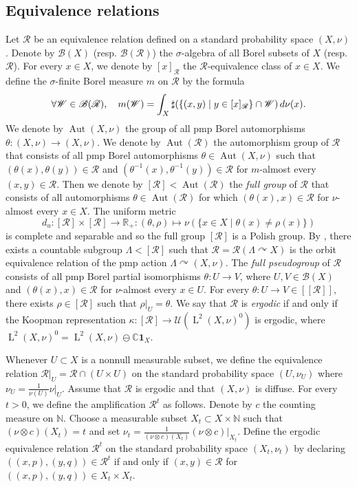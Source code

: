 \documentclass[11pt]{amsart}
\numberwithin{equation}{section}
\theoremstyle{plain}
\theoremstyle{definition}
\newcommand{\N}{\mathbb{N}}
\newcommand{\R}{\mathbb{R}}
\newcommand{\C}{\mathbb{C}}
\newcommand{\Aut}{\operatorname{Aut}}
\newcommand{\rL}{\operatorname{L}}
\begin{document}
\subsection{Equivalence relations}

Let $\mathscr R$ be an equivalence relation defined on a standard probability space $(X, \nu)$. Denote by $\mathscr B(X)$ (resp.\! $\mathscr B(\mathscr R)$) the $\sigma$-algebra of all Borel subsets of $X$ (resp.\! $\mathscr R$). For every $x \in X$, we denote by $[x]_{\mathscr R}$ the $\mathscr R$-equivalence class of $x \in X$. We define the $\sigma$-finite Borel measure $m$ on $\mathscr R$ by the formula
$$\forall \mathscr W \in \mathscr B(\mathscr R), \quad m (\mathscr W) = \int_{X} \sharp (\left\{(x, y) \mid y \in [x]_{\mathscr R} \right\}\cap \mathscr W) \, {\rm d}\nu(x).$$
We denote by $\Aut(X, \nu)$ the group of all pmp Borel automorphisms $\theta : (X, \nu) \to (X, \nu)$. We denote by $\Aut(\mathscr R)$ the automorphism group of $\mathscr R$ that consists of all pmp Borel automorphisms $\theta \in \Aut(X, \nu)$ such that $(\theta(x), \theta(y)) \in \mathscr R$ and $(\theta^{-1}(x), \theta^{-1}(y)) \in \mathscr R$ for $m$-almost every $(x, y) \in \mathscr R$. Then we denote by $[\mathscr R] < \Aut(\mathscr R)$ the {\em full group} of $\mathscr R$ that consists of all automorphisms $\theta \in \Aut(\mathscr R)$ for which $(\theta(x), x) \in \mathscr R$ for $\nu$-almost every $x \in X$. The uniform metric 
$$d_u : [\mathscr R] \times [\mathscr R] \to \R_+ : (\theta, \rho) \mapsto \nu(\{x \in X \mid \theta(x) \neq \rho(x)\})$$
is complete and separable and so the full group $[\mathscr R]$ is a Polish group. By \cite{FM75}, there exists a countable subgroup $\Lambda < [\mathscr R]$ such that $\mathscr R = \mathscr R(\Lambda \curvearrowright X)$ is the orbit equivalence relation of the pmp action $\Lambda \curvearrowright (X, \nu)$. The {\em full pseudogroup} of $\mathscr R$ consists of all pmp Borel partial isomorphisms $\theta : U \to V$, where $U, V \in \mathscr B(X)$ and $(\theta(x), x) \in \mathscr R$ for $\nu$-almost every $x \in U$. For every $\theta : U \to V \in [[\mathscr R]]$, there exists $\rho \in [\mathscr R]$ such that $\rho|_U = \theta$. We say that $\mathscr R$ is {\em ergodic} if and only if the Koopman representation $\kappa : [\mathscr R] \to \mathscr U(\rL^2(X, \nu)^0)$ is ergodic, where $\rL^2(X, \nu)^0 = \rL^2(X, \nu) \ominus \C \mathbf 1_X$. 

Whenever $U \subset X$ is a nonnull measurable subset, we define the equivalence relation $\mathscr R|_U = \mathscr R \cap (U \times U)$ on the standard probability space $(U, \nu_U)$ where $\nu_U = \frac{1}{\nu(U)} \nu|_U$. Assume that $\mathscr R$ is ergodic and that $(X, \nu)$ is diffuse. For every $t > 0$, we define the amplification $\mathscr R^t$ as follows. Denote by $c$ the counting measure on $\N$. Choose a measurable subset $X_t \subset X \times \N$ such that $(\nu \otimes c)(X_t) = t$ and set $\nu_t = \frac{1}{(\nu \otimes c)(X_t)} (\nu \otimes c)|_{X_t}$. Define the ergodic equivalence relation $\mathscr R^t$ on the standard probability space $(X_t, \nu_t)$ by declaring $((x, p), (y, q)) \in \mathscr R^t$ if and only if $(x, y) \in \mathscr R$ for $((x, p), (y, q)) \in X_t \times X_t$.
 
\end{document}
